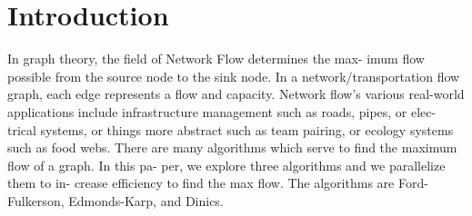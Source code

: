 \section{Introduction}

In graph theory, the field of Network Flow determines the max-
imum flow possible from the source node to the sink node. In a
network/transportation flow graph, each edge represents a flow
and capacity. Network flow’s various real-world applications
include infrastructure management such as roads, pipes, or elec-
trical systems, or things more abstract such as team pairing, or
ecology systems such as food webs. There are many algorithms
which serve to find the maximum flow of a graph. In this pa-
per, we explore three algorithms and we parallelize them to in-
crease efficiency to find the max flow. The algorithms are Ford-
Fulkerson, Edmonds-Karp, and Dinics.